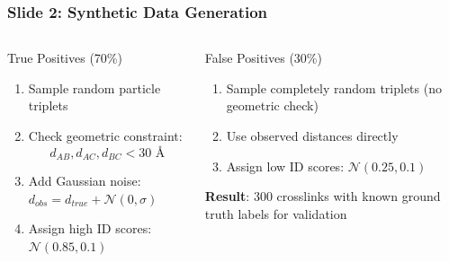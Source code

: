 \documentclass[a4paper,8pt]{beamer}
\begin{document}
\begin{frame}
\frametitle{Slide 2: Synthetic Data Generation}
\begin{columns}
\begin{column}{0.5\textwidth}
    \begin{block}{True Positives (70\%)}
        \begin{enumerate}
            \item Sample random particle triplets
            \item Check geometric constraint:
            \begin{equation*}
                d_{AB}, d_{AC}, d_{BC} < 30\text{ Å}
            \end{equation*}
            \item Add Gaussian noise: $d_{obs} = d_{true} + \mathcal{N}(0, \sigma)$
            \item Assign high ID scores: $\mathcal{N}(0.85, 0.1)$
        \end{enumerate}
    \end{block}
\end{column}

\begin{column}{0.5\textwidth}
    \begin{block}{False Positives (30\%)}
        \begin{enumerate}
            \item Sample completely random triplets (no geometric check)
            \item Use observed distances directly
            \item Assign low ID scores: $\mathcal{N}(0.25, 0.1)$
        \end{enumerate}
    \end{block}
    
    \vspace{0.5cm}
    
    \begin{highlightbox}
        \textbf{Result}: 300 crosslinks with known ground truth labels for validation
    \end{highlightbox}
\end{column}
\end{columns}
\end{frame}
\end{document}
